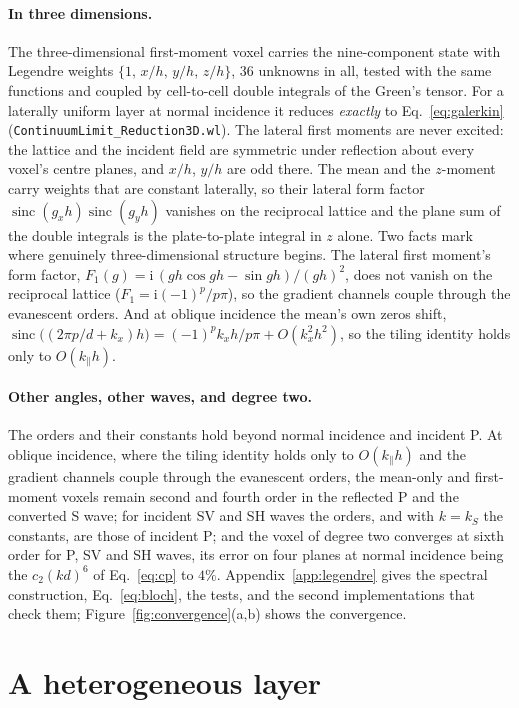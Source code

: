 \documentclass[11pt,a4paper]{article}
\newcommand{\sinc}{\operatorname{sinc}}
\newcommand{\nb}[1]{\texttt{#1}}
\begin{document}
\paragraph{In three dimensions.} The three-dimensional first-moment voxel carries the nine-component
state with Legendre weights $\{1,\,x/h,\,y/h,\,z/h\}$, 36 unknowns in all, tested with the same
functions and coupled by cell-to-cell double integrals of the Green's tensor. For a laterally uniform
layer at normal incidence it reduces \emph{exactly} to Eq.~\eqref{eq:galerkin}
(\nb{ContinuumLimit\_Reduction3D.wl}). The lateral first moments are never excited: the lattice and
the incident field are symmetric under reflection about every voxel's centre planes, and $x/h$, $y/h$
are odd there. The mean and the $z$-moment carry weights that are constant laterally, so their lateral
form factor $\sinc(g_xh)\sinc(g_yh)$ vanishes on the reciprocal lattice and the plane sum of the
double integrals is the plate-to-plate integral in $z$ alone. Two facts mark where genuinely
three-dimensional structure begins. The lateral first moment's form factor,
$F_1(g)=\mathrm{i}\,(gh\cos gh-\sin gh)/(gh)^2$, does not vanish on the reciprocal lattice
($F_1=\mathrm{i}(-1)^p/p\pi$), so the gradient channels couple through the evanescent orders. And at oblique
incidence the mean's own zeros shift, $\sinc\bigl((2\pi p/d+k_x)h\bigr)=(-1)^p k_xh/p\pi+O(k_x^2h^2)$,
so the tiling identity holds only to $O(k_\parallel h)$.

\paragraph{Other angles, other waves, and degree two.} The orders and their constants hold beyond
normal incidence and incident P. At oblique incidence, where the tiling identity holds only to
$O(k_\parallel h)$ and the gradient channels couple through the evanescent orders, the mean-only and
first-moment voxels remain second and fourth order in the reflected P and the converted S wave; for
incident SV and SH waves the orders, and with $k=k_S$ the constants, are those of incident P; and the
voxel of degree two converges at sixth order for P, SV and SH waves, its error on four planes at normal
incidence being the $c_2(kd)^6$ of Eq.~\eqref{eq:cp} to $4\%$. Appendix~\ref{app:legendre} gives the
spectral construction, Eq.~\eqref{eq:bloch}, the tests, and the second implementations that check
them; Figure~\ref{fig:convergence}(a,b) shows the convergence.


\FloatBarrier
\section{A heterogeneous layer}\label{sec:hetero}
\end{document}
